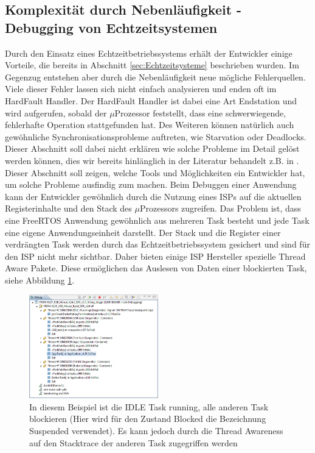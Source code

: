 \subsection{Komplexität durch Nebenläufigkeit - Debugging von Echtzeitsystemen}
\label{sec:Debugging von Echtzeitsystemen}
Durch den Einsatz eines Echtzeitbetriebssystems erhält der Entwickler einige Vorteile, die bereits in Abschnitt \ref{sec:Echtzeitsysteme} beschrieben wurden. Im Gegenzug entstehen aber durch die Nebenläufigkeit neue mögliche Fehlerquellen. Viele dieser Fehler lassen sich nicht einfach analysieren und enden oft im HardFault Handler. Der HardFault Handler ist dabei eine Art Endstation und wird aufgerufen, sobald der $\mu$Prozessor feststellt, dass eine schwerwiegende, fehlerhafte Operation stattgefunden hat. Des Weiteren können na\-tür\-lich auch gewöhnliche Synchronisationsprobleme auftreten, wie Starvation oder Deadlocks. Dieser Abschnitt soll dabei nicht erklären wie solche Probleme im Detail gelöst werden können, dies wir bereits hinlänglich in der Literatur behandelt z.B. in \cite{9783827373427} \cite{9783864902222}. Dieser Abschnitt soll zeigen, welche Tools und Möglichkeiten ein Entwickler hat, um solche Probleme ausfindig zum machen. Beim Debuggen einer Anwendung kann der Entwickler gewöhnlich durch die Nutzung eines ISPs auf die aktuellen Registerinhalte und den Stack des $\mu$Prozessors zugreifen. 
Das Problem ist, dass eine FreeRTOS Anwendung gewöhnlich aus mehreren Task besteht und jede Task eine eigene Anwendungseinheit darstellt. Der Stack und die Register einer verdrängten Task werden durch das Echtzeitbetriebssystem gesichert und sind für den ISP nicht mehr sichtbar. Daher bieten einige ISP Hersteller spezielle Thread Aware Pakete. Diese ermöglichen das Auslesen von Daten einer blockierten Task, siehe Abbildung \ref{fig:ThreadAware}.
\begin{figure}[hbt]
	\centering
		\includegraphics[width=0.5\textwidth]{Pictures/Segger/freertosThreadAwareness}
	\caption{In diesem Beispiel ist die IDLE Task running, alle anderen Task blockieren (Hier wird für den Zustand Blocked die Bezeichnung Suspended verwendet). Es kann jedoch durch die Thread Awareness auf den Stacktrace der anderen Task zugegriffen werden }
	\label{fig:ThreadAware}
\end{figure}

